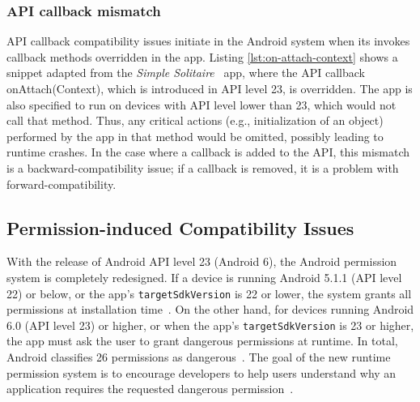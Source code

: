 \begin{figure}%
    \lstset{language=Java}
    \vspace{-0.7cm}       
     
\end{figure}


\subsubsection{API callback mismatch}

API callback compatibility issues initiate in the Android system when its invokes callback methods overridden in the app.  Listing \ref{lst:on-attach-context} shows a snippet adapted from the \emph{Simple Solitaire}~\cite{simplesolitaire} app, where the API callback \textsf{onAttach(Context)}, which is introduced in API level 23, is overridden. The app is also specified to run on devices with API level lower than 23, which would not call that method. Thus, any critical actions (e.g., initialization of
an object) performed by the app in that method would be omitted, possibly
leading to runtime crashes. In the case where a callback is added to the API, this mismatch is a backward-compatibility issue; if a callback is removed, it is a problem with forward-compatibility.

\subsection{Permission-induced Compatibility Issues} \label{sec-background:prm}

With the release of Android API level 23 (Android 6), the
Android permission system is completely redesigned.  If a
device is running Android 5.1.1 (API level 22) or below, or
the app's {\tt targetSdkVersion} is 22 or lower, the system
grants all permissions at installation
time~\cite{permissiongroups}. On the other hand, for devices
running Android 6.0 (API level 23) or higher, or when the
app's {\tt targetSdkVersion} is 23 or higher, the app must
ask the user to grant dangerous permissions at runtime.  In
total, Android classifies 26 permissions as
dangerous~\cite{dangerousAPI}.  The goal of the new runtime
permission system is to encourage developers to help users
understand why an application requires the requested
dangerous permission~\cite{runtimepermissions}. 

